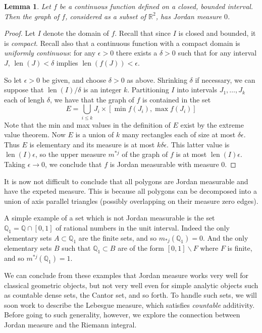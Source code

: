 \documentclass[11pt,oneside]{amsbook}
\renewcommand{\setminus}{\smallsetminus}
\newcommand{\QQ}{{\mathbb Q}}
\newcommand{\RR}{{\mathbb R}}
\DeclareMathOperator{\len}{len}
\theoremstyle{definition}
\theoremstyle{plain}
\newtheorem{lem}[thm]{Lemma}
\theoremstyle{definition}
\theoremstyle{remark}
\numberwithin{equation}{section}
\numberwithin{figure}{section}
\begin{document}
\begin{lem}
  \label{lem:jordan-graph}
  Let $f$ be a continuous function defined on a closed, bounded interval. Then the graph of $f$, considered as a subset of $\RR^2$, has Jordan measure $0$.
\end{lem}

\begin{proof}
  Let $I$ denote the domain of $f$. Recall that since $I$ is closed and bounded, it is \emph{compact}. Recall also that a continuous function with a compact domain is \emph{uniformly continuous}: for any $\epsilon>0$ there exists a $\delta>0$ such that for any interval $J$, $\len(J)<\delta$ implies $\len(f(J))<\epsilon$.

  So let $\epsilon>0$ be given, and choose $\delta>0$ as above. Shrinking $\delta$ if necessary, we can suppose that $\len(I)/\delta$ is an integer $k$. Partitioning $I$ into intervals $J_1,\ldots,J_k$ each of lengh $\delta$, we have that the graph of $f$ is contained in the set
  \[E=\bigcup_{i\leq k} J_i\times[\min f(J_i),\max f(J_i)]
  \]
  Note that the min and max values in the definition of $E$ exist by the extreme value theorem. Now $E$ is a union of $k$ many rectangles each of size at most $\delta\epsilon$. Thus $E$ is elementary and its measure is at most $k\delta\epsilon$. This latter value is $\len(I)\epsilon$, so the upper measure $m^{*j}$ of the graph of $f$ is at most $\len(I)\epsilon$. Taking $\epsilon\to0$, we conclude that $f$ is Jordan measurable with measure $0$.
\end{proof}

It is now not difficult to conclude that all polygons are Jordan measurable and have the expeted measure. This is because all polygons can be decomposed into a union of axis parallel triangles (possibly overlapping on their measure zero edges).

A simple example of a set which is not Jordan measurable is the set $\QQ_1=\QQ\cap[0,1]$ of rational numbers in the unit interval. Indeed the only elementary sets $A\subset\QQ_1$ are the finite sets, and so $m_{*j}(\QQ_1)=0$. And the only elementary sets $B$ such that $\QQ_1\subset B$ are of the form $[0,1]\setminus F$ where $F$ is finite, and so $m^{*j}(\QQ_1)=1$.

We can conclude from these examples that Jordan measure works very well for classical geometric objects, but not very well even for simple analytic objects such as countable dense sets, the Cantor set, and so forth. To handle such sets, we will soon work to describe the Lebesgue measure, which  satisfies \emph{countable} additivity. Before going to such generality, however, we explore the connection between Jordan measure and the Riemann integral.
\end{document}
